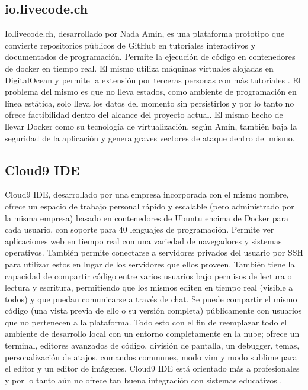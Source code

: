 \subsection{io.livecode.ch}
Io.livecode.ch, desarrollado por Nada Amin, es una plataforma prototipo que convierte repositorios públicos de GitHub en tutoriales interactivos y documentados de programación. Permite la ejecución de código en contenedores de docker en tiempo real. El mismo utiliza máquinas virtuales alojadas en DigitalOcean y permite la extensión por terceras personas con más tutoriales  \citep{io.livecode.ch}. El problema del mismo es que no lleva estados, como ambiente de programación en línea estática, solo lleva los datos del momento sin persistirlos y por lo tanto no ofrece factibilidad dentro del alcance del proyecto actual. El mismo hecho de llevar Docker como su tecnología de virtualización, según Amin, también baja la seguridad de la aplicación y genera graves vectores de ataque dentro del mismo.

\subsection{Cloud9 IDE}
Cloud9 IDE, desarrollado por una empresa incorporada con el mismo nombre, ofrece un espacio de trabajo personal rápido y escalable (pero administrado por la misma empresa) basado en contenedores de Ubuntu encima de Docker para cada usuario, con soporte para 40 lenguajes de programación. Permite ver aplicaciones web en tiempo real con una variedad de navegadores y sistemas operativos. También permite conectarse a servidores privados del usuario por SSH para utilizar estos en lugar de los servidores que ellos proveen. También tiene la capacidad de compartir código entre varios usuarios bajo permisos de lectura o lectura y escritura, permitiendo que los mismos editen en tiempo real (visible a todos) y que puedan comunicarse a través de chat. Se puede compartir el mismo código (una vista previa de ello o su versión completa) públicamente con usuarios que no pertenecen a la plataforma. Todo esto con el fin de reemplazar todo el ambiente de desarrollo local con un entorno completamente en la nube; ofrece un terminal, editores avanzados de código, división de pantalla, un debugger, temas, personalización de atajos, comandos communes, modo vim y modo sublime para el editor y un editor de imágenes. Cloud9 IDE está orientado más a profesionales y por lo tanto aún no ofrece tan buena integración con sistemas educativos \citep{Cloud9-Home}.
 

